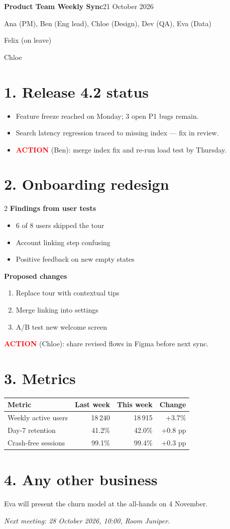 \documentclass[10pt]{article}
\newcommand{\action}[2]{\textbf{\textcolor{red}{ACTION}} (#1): #2}
\begin{document}
{\Large\bfseries Product Team Weekly Sync}\hfill 21 October 2026

\begin{description}[leftmargin=2.5cm, style=nextline]
  \item[Attendees] Ana (PM), Ben (Eng lead), Chloe (Design), Dev (QA), Eva (Data)
  \item[Absent] Felix (on leave)
  \item[Notes by] Chloe
\end{description}

\section*{1. Release 4.2 status}
\begin{itemize}[nosep]
  \item Feature freeze reached on Monday; 3 open P1 bugs remain.
  \item Search latency regression traced to missing index --- fix in review.
  \item \action{Ben}{merge index fix and re-run load test by Thursday.}
\end{itemize}

\section*{2. Onboarding redesign}
\begin{multicols}{2}
\textbf{Findings from user tests}
\begin{itemize}[nosep]
  \item 6 of 8 users skipped the tour
  \item Account linking step confusing
  \item Positive feedback on new empty states
\end{itemize}
\columnbreak
\textbf{Proposed changes}
\begin{enumerate}[nosep]
  \item Replace tour with contextual tips
  \item Merge linking into settings
  \item A/B test new welcome screen
\end{enumerate}
\end{multicols}
\action{Chloe}{share revised flows in Figma before next sync.}

\section*{3. Metrics}
\begin{tabular}{@{}lrrr@{}}
\toprule
Metric & Last week & This week & Change \\
\midrule
Weekly active users & 18\,240 & 18\,915 & +3.7\% \\
Day-7 retention & 41.2\% & 42.0\% & +0.8 pp \\
Crash-free sessions & 99.1\% & 99.4\% & +0.3 pp \\
\bottomrule
\end{tabular}

\section*{4. Any other business}
Eva will present the churn model at the all-hands on 4 November.

\vfill
\small\textit{Next meeting: 28 October 2026, 10:00, Room Juniper.}
\end{document}
